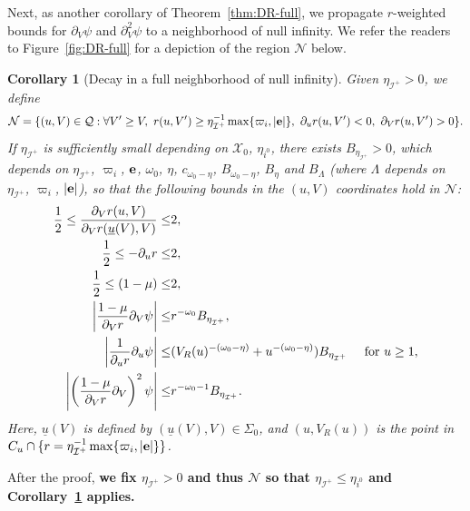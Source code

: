\documentclass[10pt, reqno]{amsart}
\newtheorem{corollary}[theorem]{Corollary}
\theoremstyle{definition}
\theoremstyle{remark}
\theoremstyle{conjecture}
\numberwithin{equation}{section}
\newcommand{\abs}[1]{\vert#1\vert}
\newcommand{\set}[1]{\{#1\}}
\newcommand{\rd}{\partial}
\newcommand{\0}{\emptyset}
\newcommand{\Lmb}{\Lambda}
\newcommand{\Sgm}{\Sigma}
\newcommand{\omg}{\omega}
\newcommand{\bfe}{{\bf e}}
\newcommand{\calI}{\mathcal I}
\newcommand{\calN}{\mathcal N}
\newcommand{\calQ}{\mathcal Q}
\newcommand{\calX}{\mathcal X}
\newcommand{\PD}{\calQ}
\newcommand{\f}{\frac}
\newcommand{\e}{\bfe}							%
\newcommand{\NI}{\calI^{+}}						%
\newcommand{\Abs}[1]{\left\vert #1 \right\vert}
\begin{document}
Next, as another corollary of Theorem~\ref{thm:DR-full}, we propagate $r$-weighted bounds for $\rd_{V} \psi$ and $\rd_{V}^{2} \psi$ to a neighborhood of null infinity. We refer the readers to Figure~\ref{fig:DR-full} for a depiction of the region $\mathcal N$ below.
\begin{corollary}[Decay in a full neighborhood of null infinity] \label{cor:DR-large-r}
Given $\eta_{\NI} > 0$, we define
\begin{equation*}
	\calN = \set{(u, V) \in \PD : \forall V' \geq V, \ r(u, V') \geq \eta_{\NI}^{-1} \max \set{ \varpi_{i}, \abs{\e} },\ \rd_{u} r (u, V') < 0, \ \rd_{V} r (u, V') > 0}.
\end{equation*}
If $\eta_{\NI}$ is sufficiently small depending on $\calX_{0}$, $\eta_{i^{0}}$, there exists $B_{\eta_{\NI}} >  0 $, which depends on $\eta_{\NI}$, $\varpi_{i}$, $\e$, $\omg_{0}$, $\eta$, $c_{\omg_{0}-\eta}$, $B_{\omg_{0}-\eta}$, $B_{\eta}$ and $B_{\Lmb}$ (where $\Lmb$ depends on $\eta_{\NI}$, $\varpi_{i}$, $\abs{\e}$), so that the following bounds in the $(u,V)$ coordinates hold in $\calN$:
\begin{align} 
	\frac{1}{2} \leq \frac{\rd_{V} r(u, V)}{\rd_{V} r (\underline{u}(V), V)}\leq & 2 , \label{eq:DR:dvr-large-r} \\
	\frac{1}{2} \leq -\rd_{u} r \leq & 2 , \label{eq:DR:dur-large-r} \\
	\f 12\leq (1-\mu) \leq & 2, \label{eq:DR:1-mu-large-r} \\
	\Abs{\frac{1-\mu}{\rd_{V} r} \rd_{V} \psi} \leq & r^{-\omg_{0}} B_{\eta_{\NI}} , \label{eq:DR:dvrphi-large-r} \\
	\Abs{\frac{1}{\rd_{u} r} \rd_{u} \psi} \leq & (V_{R}(u)^{-(\omg_{0}-\eta)} + u^{-(\omg_{0} - \eta)}) B_{\eta_{\NI}} \quad \hbox{ for } u \geq 1, \label{eq:DR:durphi-large-r} \\
	\Abs{\left(\frac{1-\mu}{\rd_{V} r} \rd_{V}\right)^{2} \psi} \leq & r^{-\omg_{0}-1} B_{\eta_{\NI}}.\label{eq:DR:dvdvrphi-large-r}
\end{align}
Here, $\underline{u}(V)$ is defined by $(\underline{u}(V), V) \in \Sgm_{0}$, and $(u, V_{R}(u))$ is the point in $C_u\cap \set{r = \eta_{\NI}^{-1} \max\set{\varpi_{i}, \abs{\e}}}$.
\end{corollary}

After the proof, {\bf we fix $\eta_{\NI} > 0$ and thus $\calN$ so that $\eta_{\NI} \leq \eta_{i^{0}}$ and Corollary~\ref{cor:DR-large-r} applies.}
\end{document}
